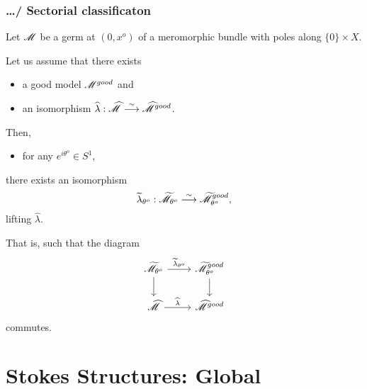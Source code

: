 \subsection{\dots / Sectorial classificaton} %
\begin{paracol}{2} %
  \switchcolumn{} %
  Let $\mathscr{M}$ be a germ at $(0,x^o)$ of a meromorphic bundle with poles along
  $\{0\}\times X$.
  \begin{thm}[II.5.12]
    Let us assume that there exists
    \begin{itemize}
      \item a good model $\mathscr{M}^{good}$ and
      \item an isomorphism $\widehat\lambda: \widehat{\mathscr{M}}
        \overset{\sim}{\longrightarrow}\widehat{\mathscr{M}}^{good}$.
    \end{itemize}
    Then,
    \begin{itemize}
      \item for any $e^{i\theta^o}\in S^1$,
    \end{itemize}
    there exists an isomorphism
    \[
      \widetilde\lambda_{\theta^o}: \widetilde{\mathscr{M}}_{\theta^o}
      \overset{\sim}{\longrightarrow}\widetilde{\mathscr{M}}^{good}_{\theta^o},
    \]
    lifting $\hat\lambda$.
  \end{thm}
  That is, such that the diagram
  \[ \begin{tikzcd}
      \tilde\sM_{\theta^o} \dar \rar{\tilde\lambda_{\theta^o}} &
        \tilde\sM^{good}_{\theta^o} \dar
        \\\hat\sM \rar{\hat\lambda} &
        \hat\sM^{good}
  \end{tikzcd} \]
  commutes.
\end{paracol} %

\chapter{Stokes Structures: Global}
